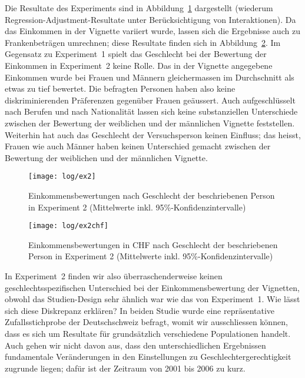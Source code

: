 \documentclass[a4paper,12pt]{article}
\begin{document}
 

\noindent 
Die Resultate des Experiments sind in Abbildung~\ref{fig-ex2}
dargestellt (wiederum Regression-Adjustment-Resultate unter Berücksichtigung
von Interaktionen). Da das Einkommen in der Vignette variiert wurde, lassen sich die 
Ergebnisse auch zu Frankenbeträgen umrechnen; diese Resultate finden sich in 
Abbildung~\ref{fig-ex2chf}. Im Gegensatz zu Experiment~1 spielt das Geschlecht bei der
Bewertung der Einkommen in Experiment~2 keine Rolle. Das in der Vignette
angegebene Einkommen wurde bei Frauen und Männern gleichermassen im
Durchschnitt als etwas zu tief bewertet. Die befragten Personen haben also
keine diskriminierenden Präferenzen gegenüber Frauen geäussert. Auch
aufgeschlüsselt nach Berufen und nach Nationalität lassen sich keine
substanziellen Unterschiede zwischen der Bewertung der weiblichen und der
männlichen Vignette feststellen. Weiterhin hat auch das Geschlecht der
Versuchsperson keinen Einfluss; das heisst, Frauen wie auch Männer haben keinen
Unterschied gemacht zwischen der Bewertung der weiblichen und der männlichen
Vignette.

\begin{figure}\centering
    \texttt{[image: log/ex2]}
    \caption{Einkommensbewertungen nach Geschlecht der beschriebenen Person in 
    Experiment 2 (Mittelwerte inkl. 95\%-Konfidenzintervalle)}\label{fig-ex2}
\end{figure}
\begin{figure}\centering
    \texttt{[image: log/ex2chf]}
    \caption{Einkommensbewertungen in CHF nach Geschlecht der beschriebenen Person in 
    Experiment 2 (Mittelwerte inkl. 95\%-Konfidenzintervalle)}\label{fig-ex2chf}
\end{figure}


In Experiment~2 finden wir also überraschenderweise keinen geschlechtsspezifischen
Unterschied bei der Einkommensbewertung der Vignetten, obwohl das
Studien-Design sehr ähnlich war wie das von Experiment~1. Wie lässt sich diese
Diskrepanz erklären? In beiden Studie wurde eine repräsentative
Zufallsstichprobe der Deutschschweiz befragt, womit wir ausschliessen können,
dass es sich um Resultate für grundsätzlich verschiedene Populationen handelt.
Auch gehen wir nicht davon aus, dass den unterschiedlichen Ergebnissen
fundamentale Veränderungen in den Einstellungen zu Geschlechtergerechtigkeit
zugrunde liegen; dafür ist der Zeitraum von 2001 bis 2006 zu kurz.
\end{document}
